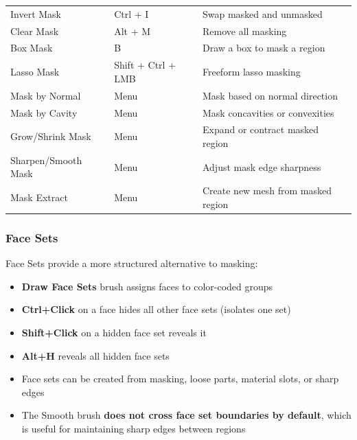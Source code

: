 \begin{shortcutbox}
\begin{center}
\begin{tabularx}{\textwidth}{L{4cm}C{3.5cm}X}
\toprule
{}
 &  &  \\
\midrule
Invert Mask & Ctrl + I & Swap masked and unmasked \\
Clear Mask & Alt + M & Remove all masking \\
Box Mask & B & Draw a box to mask a region \\
Lasso Mask & Shift + Ctrl + LMB & Freeform lasso masking \\
Mask by Normal & Menu & Mask based on normal direction \\
Mask by Cavity & Menu & Mask concavities or convexities \\
Grow/Shrink Mask & Menu & Expand or contract masked region \\
Sharpen/Smooth Mask & Menu & Adjust mask edge sharpness \\
Mask Extract & Menu & Create new mesh from masked region \\
\bottomrule
\end{tabularx}
\end{center}
\end{shortcutbox}

\subsubsection{Face Sets}

Face Sets provide a more structured alternative to masking:
\begin{itemize}[leftmargin=2em]
  \item \textbf{Draw Face Sets} brush assigns faces to color-coded groups
  \item \textbf{Ctrl+Click} on a face hides all other face sets (isolates one set)
  \item \textbf{Shift+Click} on a hidden face set reveals it
  \item \textbf{Alt+H} reveals all hidden face sets
  \item Face sets can be created from masking, loose parts, material slots, or sharp edges
  \item The Smooth brush \textbf{does not cross face set boundaries by default}, which is useful for maintaining sharp edges between regions
\end{itemize}

